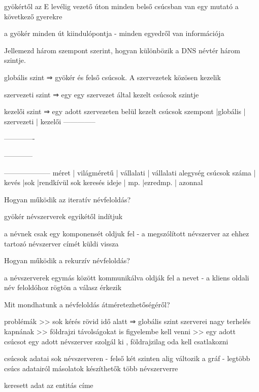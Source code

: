 \documentclass[12pt]{article}
\begin{document}
\begin{description}
        \item gyökértől az E levélig vezető úton minden belső csúcsban van egy mutató a következő gyerekre
        \item a gyökér minden út kiindulópontja
            - minden egyedről van információja
        \item  Jellemezd három szempont szerint, hogyan különbözik a DNS névtér három szintje.
        \item globális szint   ⇒ gyökér és felső csúcsok. A szervezetek közösen kezelik
        \item szervezeti szint ⇒ egy egy szervezet által kezelt csúcsok szintje
        \item kezelői szint    ⇒ egy adott szervezeten belül kezelt csúcsok
            szempont      |globális     | szervezeti | kezelői
            --------------\item-------------\item------------\item--------------------
            méret         | világméretű | vállalati  | vállalati alegység
            csúcsok száma | kevés       |sok         |rendkívül sok
            keresés ideje | mp.         |ezredmp.    | azonnal
        \item  Hogyan működik az iteratív névfeloldás?
        \item gyökér névszerverek egyikétől indítjuk
        \item a névnek csak egy komponensét oldjuk fel
            - a megszólított névszerver az ehhez tartozó névszerver címét küldi vissza
        \item  Hogyan működik a rekurzív névfeloldás?
        \item a névszerverek egymás között kommunikálva oldják fel a nevet
            - a kliens oldali név feloldóhoz rögtön a válasz érkezik
        \item  Mit mondhatunk a névfeloldás átméretezhetőségéről?
        \item problémák 
            >> sok kérés rövid idő alatt ⇒ globális szint szerverei nagy terhelés kapnának
            >> földrajzi távolságokat is figyelembe kell venni
            >> egy adott csúcsot egy adott névszerver szolgál ki , földrajzilag oda kell csatlakozni
        \item csúcsok adatai sok névszerveren
            - felső két szinten alig változik a gráf
            - legtöbb csúcs adatairól másolatok készíthetők több névszerverre
        \item keresett adat az entitás címe

\end{description}
\end{document}
